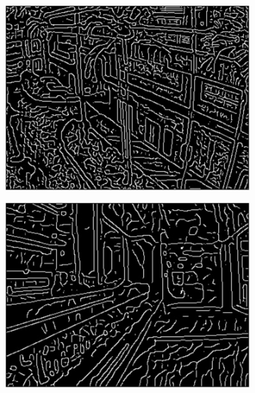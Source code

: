 \begin{figure}
\begin{subfigure}{0.49\columnwidth}
    \includegraphics[width=1.00\textwidth]{media/V_E_highsnrlowcanny.jpg}
    	\caption{}
		\label{fig:edgeprocessing_5}
  \end{subfigure}
	\begin{subfigure}{0.49\columnwidth}
    \centering
    \includegraphics[width=1.00\textwidth]{media/V_E_lowsnrlowcanny.jpg}
		\caption{}
		\label{fig:edgeprocessing_6}
  \end{subfigure} \vspace{10pt} \\ 
	\begin{subfigure}{0.49\columnwidth}
    \centering

\end{subfigure}
\end{figure}
